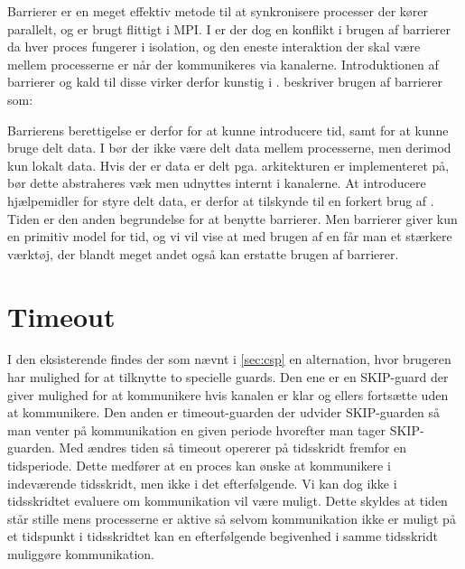 Barrierer er en meget effektiv metode til at synkronisere processer der kører 
parallelt, og er brugt flittigt i MPI. I \csp er der dog en konflikt i brugen 
af barrierer da hver proces fungerer i isolation, og den eneste interaktion der 
skal være mellem processerne er når der kommunikeres via kanalerne. 
Introduktionen af barrierer og kald til disse virker derfor kunstig i \csp. 
\citeauthor{crew} beskriver brugen af barrierer som:


Barrierens berettigelse er derfor for at kunne introducere tid, samt for at kunne bruge delt data. I \csp bør der ikke være delt data mellem processerne, men derimod kun  lokalt data. Hvis der er data er delt pga. arkitekturen \csp er implementeret på, bør dette abstraheres væk men udnyttes internt i kanalerne. At introducere hjælpemidler for styre delt data, er derfor at tilskynde til en forkert brug af \csp. Tiden er den anden begrundelse for at benytte barrierer.
Men barrierer giver kun en  primitiv model for tid, og vi vil vise at med brugen af en \des får man et stærkere værktøj, der blandt meget andet også kan erstatte brugen af barrierer.
\section{Timeout} 
I den eksisterende \pycsp findes der som nævnt i \cref{sec:csp} en alternation, hvor brugeren har mulighed for at tilknytte to specielle guards. Den ene er en SKIP-guard der giver mulighed for at kommunikere hvis kanalen er klar og ellers fortsætte uden at kommunikere. Den anden er timeout-guarden der udvider SKIP-guarden så man venter på kommunikation en given periode hvorefter man tager SKIP-guarden. 
Med \des ændres tiden så timeout opererer på tidsskridt fremfor en tidsperiode. Dette medfører at en proces kan ønske at kommunikere i indeværende tidsskridt, men ikke i det efterfølgende.
Vi kan dog ikke i tidsskridtet evaluere om kommunikation vil være muligt. Dette skyldes at tiden står stille mens processerne er aktive så selvom kommunikation ikke er muligt på et tidspunkt i tidsskridtet kan en efterfølgende begivenhed i samme tidsskridt muliggøre kommunikation.

